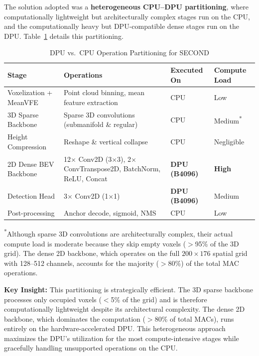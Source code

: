 \documentclass[12pt, a4paper]{report}
\begin{document}
The solution adopted was a \textbf{heterogeneous CPU--DPU partitioning}, where computationally lightweight but architecturally complex stages run on the CPU, and the computationally heavy but DPU-compatible dense stages run on the DPU. Table~\ref{tab:second_partition} details this partitioning.

\begin{table}[H]
\centering
\caption{DPU vs.\ CPU Operation Partitioning for SECOND}
\label{tab:second_partition}
\begin{tabular}{@{}p{3.5cm} p{5cm} p{2.5cm} p{2.5cm}@{}}
\toprule
\textbf{Stage} & \textbf{Operations} & \textbf{Executed On} & \textbf{Compute Load} \\
\midrule
Voxelization + MeanVFE & Point cloud binning, mean feature extraction & CPU & Low \\
\midrule
3D Sparse Backbone & Sparse 3D convolutions (submanifold \& regular) & CPU & Medium\textsuperscript{*} \\
\midrule
Height Compression & Reshape \& vertical collapse & CPU & Negligible \\
\midrule
2D Dense BEV Backbone & 12$\times$ Conv2D (3$\times$3), 2$\times$ ConvTranspose2D, BatchNorm, ReLU, Concat & \textbf{DPU (B4096)} & \textbf{High} \\
\midrule
Detection Head & 3$\times$ Conv2D (1$\times$1) & \textbf{DPU (B4096)} & Medium \\
\midrule
Post-processing & Anchor decode, sigmoid, NMS & CPU & Low \\
\bottomrule
\end{tabular}
\begin{flushleft}
\small \textsuperscript{*}Although sparse 3D convolutions are architecturally complex, their actual compute load is moderate because they skip empty voxels ($>$95\% of the 3D grid). The dense 2D backbone, which operates on the full $200 \times 176$ spatial grid with 128--512 channels, accounts for the majority ($>$80\%) of the total MAC operations.
\end{flushleft}
\end{table}

\textbf{Key Insight:} This partitioning is strategically efficient. The 3D sparse backbone processes only occupied voxels ($<$5\% of the grid) and is therefore computationally lightweight despite its architectural complexity. The dense 2D backbone, which dominates the computation ($>$80\% of total MACs), runs entirely on the hardware-accelerated DPU. This heterogeneous approach maximizes the DPU's utilization for the most compute-intensive stages while gracefully handling unsupported operations on the CPU.
\end{document}
